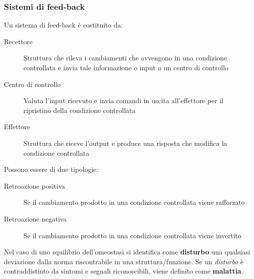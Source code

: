 \documentclass[a4paper]{article}
\begin{document}
\subsubsection{Sistemi di feed-back}
Un sistema di feed-back è costituito da:
\begin{description}
    \item[Recettore] Struttura che rileva i cambiamenti che avvengono in una 
    condizione controllata e invia tale informazione o input a un centro di 
    controllo
    \item[Centro di controllo] Valuta l’input ricevuto e invia comandi in 
    uscita all’effettore per il ripristino della condizione controllata
    \item[Effettore] Struttura che riceve l’output e produce una risposta 
    che modifica la condizione controllata
\end{description}
Possono essere di due tipologie:
\begin{description}
    \item[Retroazione positiva] Se il cambiamento prodotto in una condizione
    controllata viene rafforzato
    \item[Retroazione negativa] Se il cambiamento prodotto in una condizione
    controllata viene invertito
\end{description}
Nel caso di uno squilibrio dell'omeostasi si identifica come \textbf{disturbo}
una qualsiasi deviazione dalla norma riscontrabile in una struttura/funzione.
Se un \textit{disturbo} è contraddistinto da sintomi e segnali riconoscibili,
viene definito come \textbf{malattia}.
\end{document}
